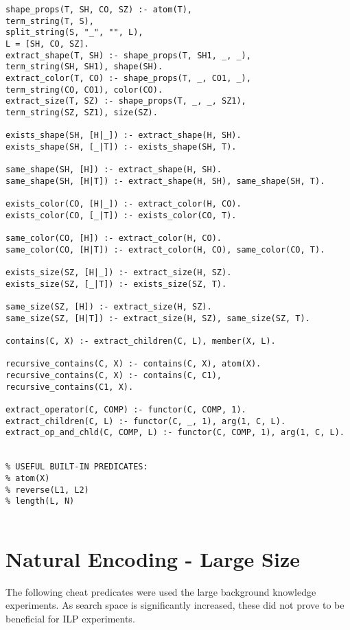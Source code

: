 \begin{verbatim}
shape_props(T, SH, CO, SZ) :- atom(T), 
term_string(T, S), 
split_string(S, "_", "", L), 
L = [SH, CO, SZ].
extract_shape(T, SH) :- shape_props(T, SH1, _, _), 
term_string(SH, SH1), shape(SH).
extract_color(T, CO) :- shape_props(T, _, CO1, _), 
term_string(CO, CO1), color(CO).
extract_size(T, SZ) :- shape_props(T, _, _, SZ1), 
term_string(SZ, SZ1), size(SZ).

exists_shape(SH, [H|_]) :- extract_shape(H, SH).
exists_shape(SH, [_|T]) :- exists_shape(SH, T).

same_shape(SH, [H]) :- extract_shape(H, SH).
same_shape(SH, [H|T]) :- extract_shape(H, SH), same_shape(SH, T).

exists_color(CO, [H|_]) :- extract_color(H, CO).
exists_color(CO, [_|T]) :- exists_color(CO, T).

same_color(CO, [H]) :- extract_color(H, CO).
same_color(CO, [H|T]) :- extract_color(H, CO), same_color(CO, T).

exists_size(SZ, [H|_]) :- extract_size(H, SZ).
exists_size(SZ, [_|T]) :- exists_size(SZ, T).

same_size(SZ, [H]) :- extract_size(H, SZ).
same_size(SZ, [H|T]) :- extract_size(H, SZ), same_size(SZ, T).

contains(C, X) :- extract_children(C, L), member(X, L).

recursive_contains(C, X) :- contains(C, X), atom(X).
recursive_contains(C, X) :- contains(C, C1), 
recursive_contains(C1, X).

extract_operator(C, COMP) :- functor(C, COMP, 1).
extract_children(C, L) :- functor(C, _, 1), arg(1, C, L).
extract_op_and_chld(C, COMP, L) :- functor(C, COMP, 1), arg(1, C, L).


% USEFUL BUILT-IN PREDICATES:
% atom(X)
% reverse(L1, L2)
% length(L, N)
	
\end{verbatim}

\section{Natural Encoding - Large Size}
The following cheat predicates were used the large background knowledge experiments. As search space is significantly increased, these did not prove to be beneficial for ILP experiments.
$\ $\\

